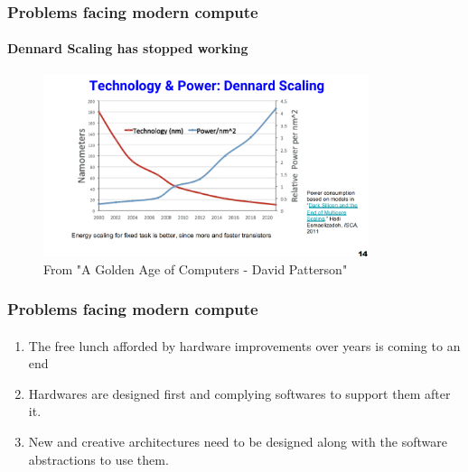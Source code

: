 \documentclass{beamer}
\begin{document}
\begin{frame}[fragile]
\frametitle{Problems facing modern compute}
  \framesubtitle{Dennard Scaling has stopped working}

  \begin{figure}
    \centering
    \includegraphics[width=0.85\textwidth]{dennardscaling.png}
    \caption{From "A Golden Age of Computers - David Patterson"}
  \end{figure}
\end{frame}

\begin{frame}[fragile]
\frametitle{Problems facing modern compute}
  \framesubtitle{}
  \begin{enumerate}
    \item The free lunch afforded by hardware improvements over years
      is coming to an end
    \item Hardwares are designed first and complying softwares to support
      them after it.
    \item New and creative architectures need to be designed along with the
      software abstractions to use them. 
  \end{enumerate}
\end{frame}
\end{document}
